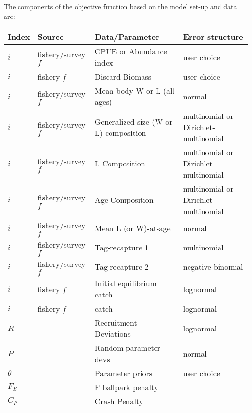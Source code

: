 The components of the objective function based on the model set-up and data are: 
\begin{longtable}{p{1cm} p{2.75cm} p{4.75cm} p{6.5cm}}
	\hline
	Index & Source & Data/Parameter & Error structure \Tstrut\Bstrut\\
	\hline	
	$i$ & fishery/survey $f$ & CPUE or Abundance index	 & user choice \Tstrut\\
	$i$ & fishery $f$		 & Discard Biomass			 & user choice \Tstrut\\
	$i$ & fishery/survey $f$ & Mean body W or L (all ages) & normal \Tstrut\\
	$i$ & fishery/survey $f$ & Generalized size (W or L) composition & multinomial or Dirichlet-multinomial \Tstrut\\
	$i$ & fishery/survey $f$ & L Composition	 		 & multinomial or Dirichlet-multinomial \Tstrut\\
	$i$ & fishery/survey $f$ & Age Composition			 & multinomial or Dirichlet-multinomial \Tstrut\\
	$i$ & fishery/survey $f$ & Mean L (or W)-at-age 	 & normal \Tstrut\\
	$i$ & fishery/survey $f$ & Tag-recapture 1			 & multinomial \Tstrut\\
	$i$ & fishery/survey $f$ & Tag-recapture 2			 & negative binomial \Tstrut\\
	$i$ & fishery $f$		 & Initial equilibrium catch & lognormal \Tstrut\\
	$i$ & fishery $f$		 & catch					 & lognormal \Tstrut\\
	$R$ & 					 & Recruitment Deviations	 & lognormal \Tstrut\\
	$P$ & 					 & Random parameter devs  	 & normal \Tstrut\\
	$\theta$ & 				 & Parameter priors			 & user choice \Tstrut\\
	$F_B$ & 				 & F ballpark penalty		 & \Tstrut\\
	$C_P$ &					 & Crash Penalty			 & \Tstrut\Bstrut\\
	\hline
\end{longtable}




\pagebreak